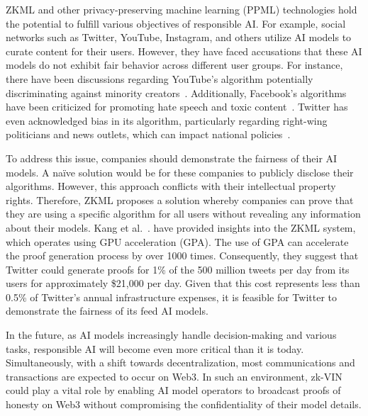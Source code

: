 \documentclass[conference]{IEEEtran}
\begin{document}
ZKML and other privacy-preserving machine learning (PPML) technologies hold the potential to fulfill various objectives of responsible AI. For example, social networks such as Twitter, YouTube, Instagram, and others utilize AI models to curate content for their users. However, they have faced accusations that these AI models do not exhibit fair behavior across different user groups. For instance, there have been discussions regarding YouTube's algorithm potentially discriminating against minority creators~\cite{YoutubeAlgorithmHackernoon}. Additionally, Facebook's algorithms have been criticized for promoting hate speech and toxic content~\cite{FacebookAlgorithmPeoplesDispatch}. Twitter has even acknowledged bias in its algorithm, particularly regarding right-wing politicians and news outlets, which can impact national policies~\cite{TwitterBiasTheGuardian}.



To address this issue, companies should demonstrate the fairness of their AI models. A naïve solution would be for these companies to publicly disclose their algorithms. However, this approach conflicts with their intellectual property rights. Therefore, ZKML proposes a solution whereby companies can prove that they are using a specific algorithm for all users without revealing any information about their models. Kang et al.~\cite{TensorPlonkMedium}. have provided insights into the ZKML system, which operates using GPU acceleration (GPA). The use of GPA can accelerate the proof generation process by over 1000 times. Consequently, they suggest that Twitter could generate proofs for 1\% of the 500 million tweets per day from its users for approximately \$21,000 per day. Given that this cost represents less than 0.5\% of Twitter's annual infrastructure expenses, it is feasible for Twitter to demonstrate the fairness of its feed AI models.

In the future, as AI models increasingly handle decision-making and various tasks, responsible AI will become even more critical than it is today. Simultaneously, with a shift towards decentralization, most communications and transactions are expected to occur on Web3. In such an environment, zk-VIN could play a vital role by enabling AI model operators to broadcast proofs of honesty on Web3 without compromising the confidentiality of their model details.
\end{document}
